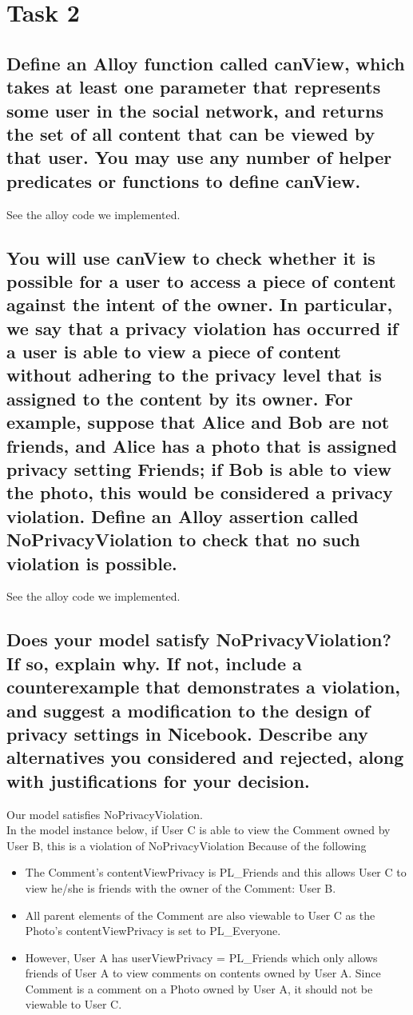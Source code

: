 \documentclass[titlepage]{article}
\begin{document}
\section{Task 2}
\subsection{Define an Alloy function called canView, which takes at least one parameter that represents some user in the
	social network, and returns the set of all content that can be viewed by that user. You may use any number of
	helper predicates or functions to define canView.}

See the alloy code we implemented.

\subsection{You will use canView to check whether it is possible for a user to access a piece of content against the intent of the owner. In particular, we say that a privacy violation has occurred if a user is able to view a piece of content without adhering to the privacy level that is assigned to the content by its owner. For example, suppose that Alice
	and Bob are not friends, and Alice has a photo that is assigned privacy setting Friends; if Bob is able to view the
	photo, this would be considered a privacy violation. Define an Alloy assertion called NoPrivacyViolation
	to check that no such violation is possible.}

See the alloy code we implemented.

\subsection{Does your model satisfy NoPrivacyViolation? If so, explain why. If not, include a counterexample that
	demonstrates a violation, and suggest a modification to the design of privacy settings in Nicebook. Describe
	any alternatives you considered and rejected, along with justifications for your decision.}

Our model satisfies NoPrivacyViolation. \\
In the model instance below, if User C is able to view the Comment owned by User B, this is a violation of NoPrivacyViolation Because of the following
\begin{itemize}
	\item The Comment's contentViewPrivacy is PL\_Friends and this allows User C to view he/she is friends with the owner of the Comment: User B.
	\item All parent elements of the Comment are also viewable to User C as the Photo's contentViewPrivacy is set to PL\_Everyone.
	\item However, User A has userViewPrivacy = PL\_Friends which only allows friends of User A to view comments on contents owned by User A. Since Comment is a comment on a Photo owned by User A, it should not be viewable to User C.
\end{itemize}
\end{document}
